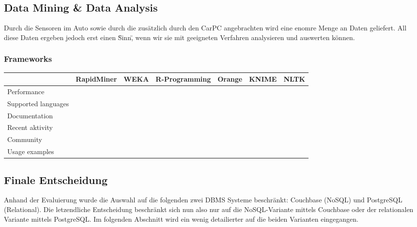 	\newpage
	\subsection{Data Mining \& Data Analysis}
	Durch die Sensoren im Auto sowie durch die zusätzlich durch den CarPC angebrachten wird eine enomre Menge an Daten geliefert. All diese Daten ergeben jedoch erst einen \"Sinn\", wenn wir sie mit geeigneten Verfahren analysieren und auswerten können. 

		\subsubsection{Frameworks}

		\begin{tabular} {| l | c | c | c | c | c | c |}
			\hline
			& RapidMiner & WEKA &  R-Programming & Orange & KNIME & NLTK		\\ \hline \hline
			Performance &  &	 &  &  &  &  &		\\ \hline
			Supported languages &  &	 &  &  &  &  &	 			\\ \hline
			Documentation &  &	 &  &  &  &  &	 		\\ \hline
			Recent aktivity &  &	 &  &  &  &  &			\\ \hline
			Community &  &  &  &  &  &  &		\\ \hline 
			Usage examples	&  &	&  &  &  &  &					\\ \hline
		\end{tabular}

	\newpage
	\subsection{Finale Entscheidung}
	Anhand der Evaluierung wurde die Auswahl auf die folgenden zwei DBMS Systeme beschränkt: Couchbase (NoSQL) und PostgreSQL (Relational). Die letzendliche Entscheidung beschränkt sich nun also nur auf die NoSQL-Variante mittels Couchbase oder der relationalen Variante mittels PostgreSQL. Im folgenden Abschnitt wird ein wenig detailierter auf die beiden Varianten eingegangen.


